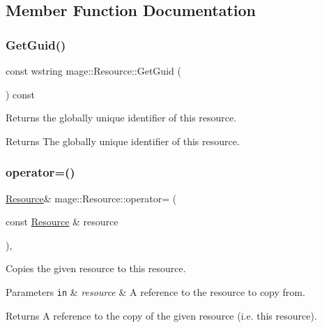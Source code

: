 \subsection{Member Function Documentation}
\hypertarget{classmage_1_1_resource_a62d9dc4728df43a66036f4aff30828ff}{}\label{classmage_1_1_resource_a62d9dc4728df43a66036f4aff30828ff} 
\subsubsection{\texorpdfstring{Get\+Guid()}{GetGuid()}}
{\footnotesize\ttfamily const wstring mage\+::\+Resource\+::\+Get\+Guid (\begin{DoxyParamCaption}{ }\end{DoxyParamCaption}) const}

Returns the globally unique identifier of this resource.

\begin{DoxyReturn}{Returns}
The globally unique identifier of this resource. 
\end{DoxyReturn}
\hypertarget{classmage_1_1_resource_ad8fa57f37eb253b90d18d33383b12875}{}\label{classmage_1_1_resource_ad8fa57f37eb253b90d18d33383b12875} 
\subsubsection{\texorpdfstring{operator=()}{operator=()}\hspace{0.1cm}{\footnotesize\ttfamily [1/2]}}
{\footnotesize\ttfamily \hyperlink{classmage_1_1_resource}{Resource}\& mage\+::\+Resource\+::operator= (\begin{DoxyParamCaption}\item[{const \hyperlink{classmage_1_1_resource}{Resource} \&}]{resource }\end{DoxyParamCaption})\hspace{0.3cm}{\ttfamily [private]}, {\ttfamily [delete]}}

Copies the given resource to this resource.


\begin{DoxyParams}[1]{Parameters}
\mbox{\tt in}  & {\em resource} & A reference to the resource to copy from. \\
\hline
\end{DoxyParams}
\begin{DoxyReturn}{Returns}
A reference to the copy of the given resource (i.\+e. this resource). 
\end{DoxyReturn}
\hypertarget{classmage_1_1_resource_a5d087980bb8fb1cd7d96c22d9e0eb519}{}\label{classmage_1_1_resource_a5d087980bb8fb1cd7d96c22d9e0eb519} 
